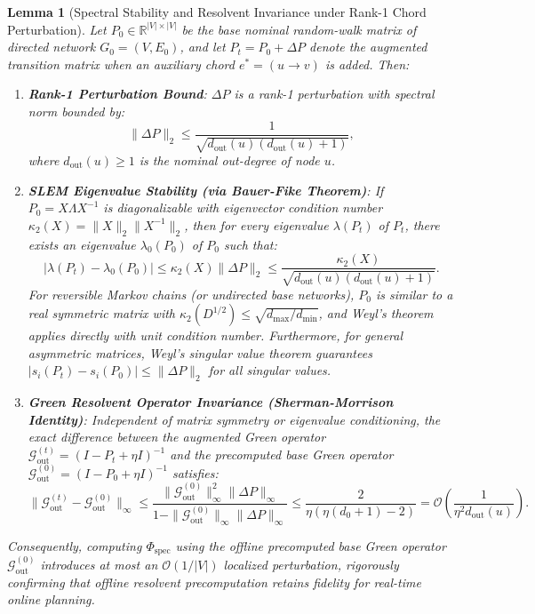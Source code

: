 \documentclass[11pt,a4paper]{article}
\newtheorem{lemma}{Lemma}
\begin{document}
\begin{lemma}[Spectral Stability and Resolvent Invariance under Rank-1 Chord Perturbation]
\label{lem:weyl_stability}
Let $P_0 \in \mathbb{R}^{|V| \times |V|}$ be the base nominal random-walk matrix of directed network $G_0 = (V, E_0)$, and let $P_t = P_0 + \Delta P$ denote the augmented transition matrix when an auxiliary chord $e^* = (u \to v)$ is added. Then:
\begin{enumerate}
    \item \textbf{Rank-1 Perturbation Bound}: $\Delta P$ is a rank-1 perturbation with spectral norm bounded by:
    \begin{equation}
    \|\Delta P\|_2 \le \frac{1}{\sqrt{d_{\text{out}}(u) (d_{\text{out}}(u) + 1)}},
    \end{equation}
    where $d_{\text{out}}(u) \ge 1$ is the nominal out-degree of node $u$.
    \item \textbf{SLEM Eigenvalue Stability (via Bauer-Fike Theorem)}: If $P_0 = X \Lambda X^{-1}$ is diagonalizable with eigenvector condition number $\kappa_2(X) = \|X\|_2 \|X^{-1}\|_2$, then for every eigenvalue $\lambda(P_t)$ of $P_t$, there exists an eigenvalue $\lambda_0(P_0)$ of $P_0$ such that:
    \begin{equation}
    \label{eq:bauer_fike_bound}
    \left| \lambda(P_t) - \lambda_0(P_0) \right| \le \kappa_2(X) \|\Delta P\|_2 \le \frac{\kappa_2(X)}{\sqrt{d_{\text{out}}(u)(d_{\text{out}}(u)+1)}}.
    \end{equation}
    For reversible Markov chains (or undirected base networks), $P_0$ is similar to a real symmetric matrix with $\kappa_2(D^{1/2}) \le \sqrt{d_{\max}/d_{\min}}$, and Weyl's theorem applies directly with unit condition number. Furthermore, for general asymmetric matrices, Weyl's singular value theorem guarantees $|s_i(P_t) - s_i(P_0)| \le \|\Delta P\|_2$ for all singular values.
    \item \textbf{Green Resolvent Operator Invariance (Sherman-Morrison Identity)}: Independent of matrix symmetry or eigenvalue conditioning, the exact difference between the augmented Green operator $\mathcal{G}_{\text{out}}^{(t)} = (I - P_t + \eta I)^{-1}$ and the precomputed base Green operator $\mathcal{G}_{\text{out}}^{(0)} = (I - P_0 + \eta I)^{-1}$ satisfies:
    \begin{equation}
    \label{eq:green_resolvent_sherman_bound}
    \|\mathcal{G}_{\text{out}}^{(t)} - \mathcal{G}_{\text{out}}^{(0)}\|_\infty \le \frac{\|\mathcal{G}_{\text{out}}^{(0)}\|_\infty^2 \|\Delta P\|_\infty}{1 - \|\mathcal{G}_{\text{out}}^{(0)}\|_\infty \|\Delta P\|_\infty} \le \frac{2}{\eta (\eta(d_0 + 1) - 2)} = \mathcal{O}\left( \frac{1}{\eta^2 d_{\text{out}}(u)} \right).
    \end{equation}
\end{enumerate}
Consequently, computing $\Phi_{\text{spec}}$ using the offline precomputed base Green operator $\mathcal{G}_{\text{out}}^{(0)}$ introduces at most an $\mathcal{O}(1/|V|)$ localized perturbation, rigorously confirming that offline resolvent precomputation retains fidelity for real-time online planning.
\end{lemma}
\end{document}
